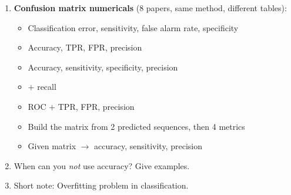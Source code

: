 \begin{enumerate}[start=28]
  \item {}  \textbf{Confusion matrix numericals} (8 papers, same method, different tables):
  \begin{itemize}
    \item Classification error, sensitivity, false alarm rate, specificity \hfill {} 
    \item Accuracy, TPR, FPR, precision \hfill {} 
    \item Accuracy, sensitivity, specificity, precision \hfill {} 
    \item $+$ recall \hfill {} 
    \item ROC $+$ TPR, FPR, precision \hfill {} 
    \item Build the matrix from 2 predicted sequences, then 4 metrics \hfill {} 
    \item Given matrix $\rightarrow$ accuracy, sensitivity, precision \hfill {} 
  \end{itemize}
  \item {} When can you \emph{not} use accuracy? Give examples. \hfill {} 
  \item {} Short note: Overfitting problem in classification. \hfill {} 
\end{enumerate}

